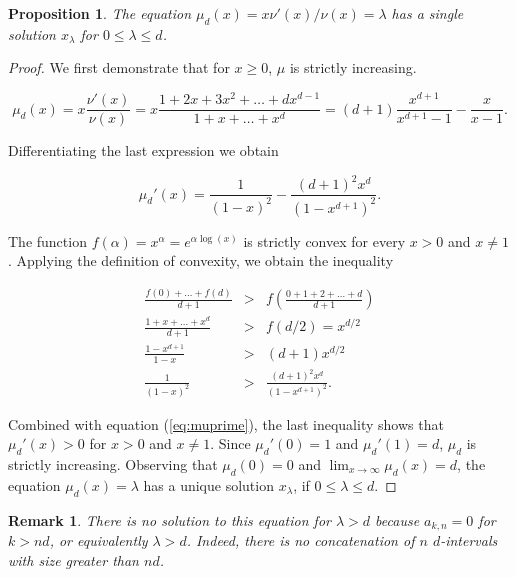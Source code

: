 \documentclass{article}
\newtheorem{proposition}{Proposition}
\newtheorem*{remark}{Remark}
\begin{document}
\begin{proposition}
\label{th:mu}
The equation $\mu_d(x) = x\nu'(x)/\nu(x) = \lambda$ has a single solution
$x_\lambda$ for $0 \leq \lambda \leq d$.
\end{proposition}

\begin{proof}
We first demonstrate that for $x \geq 0$, $\mu$ is strictly increasing.

\begin{equation}
\label{eq:mu}
\mu_d(x) = x\frac{\nu'(x)}{\nu(x)} =
x\frac{1+2x+3x^2+\ldots+dx^{d-1}}{1+x+\ldots+x^d} =
(d+1)\frac{x^{d+1}}{x^{d+1}-1} - \frac{x}{x-1}.
\end{equation} 

Differentiating the last expression we obtain

\begin{equation}
\label{eq:muprime}
\mu_d'(x) = \frac{1}{(1-x)^2} -\frac{(d+1)^2x^d}{(1-x^{d+1})^2}.
\end{equation}

The function $f(\alpha) = x^{\alpha} = e^{\alpha \log(x)}$ is strictly
convex for every $x > 0$ and $x \neq 1$. Applying the definition of
convexity, we obtain the inequality

\begin{eqnarray*}
\frac{f(0)+\ldots+f(d)}{d+1} &>&
f\left(\frac{0+1+2+\ldots+d}{d+1}\right) \\
\frac{1+x+\ldots+x^d}{d+1} &>& f(d/2) = x^{d/2} \\
\frac{1-x^{d+1}}{1-x} &>& (d+1)x^{d/2} \\
\frac{1}{(1-x)^2} &>& \frac{(d+1)^2x^d}{(1-x^{d+1})^2}.
\end{eqnarray*}

Combined with equation (\ref{eq:muprime}), the last inequality shows that
$\mu_d'(x) > 0$ for $x > 0$ and $x \neq 1$. Since $\mu_d'(0) = 1$ and
$\mu_d'(1) = d$, $\mu_d$ is strictly increasing. Observing that $\mu_d(0)
= 0$ and $\lim_{x\rightarrow\infty} \mu_d(x) = d$, the equation $\mu_d(x)
= \lambda$ has a unique solution $x_\lambda$, if $0 \leq \lambda \leq
d$.
\end{proof}

\begin{remark}
There is no solution to this equation for $\lambda > d$ because $a_{k,n} =
0$ for $k > nd$, or equivalently $\lambda > d$. Indeed, there is no
concatenation of $n$ $d$-intervals with size greater than $nd$.
\end{remark}
\end{document}
